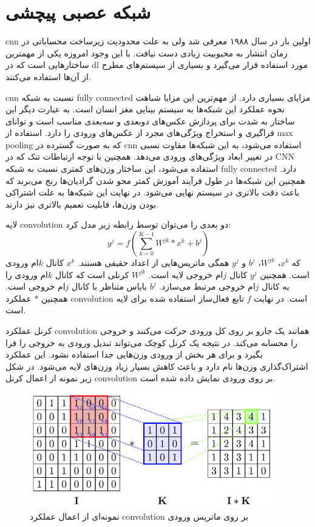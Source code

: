 \section{شبکه عصبی پیچشی}
\gls{cnn} اولین بار در سال ۱۹۸۸ معرفی شد ولی به علت محدودیت زیرساخت محساباتی در
زمان انتشار به محبوبیت زیادی دست نیافت. با این وجود امروزه یکی از مهمترین
ساختارهایی است که در \gls{dl} مورد استفاده قرار می‌گیرد و بسیاری از سیستم‌های
مطرح از آن‌ها استفاده می‌کنند.

\gls{cnn} نسبت به شبکه \gls{fully connected} مزایای بسیاری دارد. از مهم‌ترین این
مزایا شباهت نحوه عملکرد این شبکه‌ها به سیستم بینایی مغز انسان است. به عبارت دیگر
این ساختار به شدت برای پردازش عکس‌های دوبعدی و سه‌بعدی مناسب است و توانای
فراگیری و استخراج ویژگی‌های مجرد از عکس‌های ورودی را دارد. استفاده از \gls{max
pooling} که به صورت گسترده در \gls{cnn} استفاده می‌شود، به این شبکه‌ها مقاوت
نسبی در تغییر ابعاد ویژگی‌های ورودی می‌دهد. همچنین با توجه ارتباطات تنک که در
\gls{CNN} استفاده می‌شود، این ساختار وزن‌های کمتری نسبت به شبکه \gls{fully
connected} دارد. همچنین این شبکه‌ها در طول فرآیند آموزش کمتر محو شدن گرادیان‌ها
رنج می‌برند که باعث دقت بالاتری در سیستم نهایی می‌شود. در نهایت این شبکه‌ها به
علت اشتراکی بودن وزن‌ها، قابلیت تعمیم بالاتری نیز دارند.

لایه \gls{convolution} دو بعدی را می‌توان توسط رابطه زیر مدل کرد:
\begin{equation}
    y^j = f(\sum_{k=0}^{K-1} W^{jk} \ast x^k + b^j)
\end{equation}
که $x^k$، $W^{jk}$، $b^j$ و $y^j$ همگی ماتریس‌هایی از اعداد حقیقی هستند. $x^k$
کانال $k$ام ورودی است. همچنین $y^j$ کانال $j$ام خروجی لایه است. $W^{jk}$ کرنلی
است که کانال $k$ام ورودی را به کانال $j$ام خروجی مرتبط می‌سازد. $b^j$ بایاس
متناظر با کانال $j$ام خروجی است. همچنین $\ast$ عملکرد \gls{convolution} است. در
نهایت $f$ تابع فعال‌ساز استفاده شده برای لایه است.

کرنل عملکرد \gls{convolution} همانند یک جارو بر روی کل ورودی حرکت می‌کنند و
خروجی را محسابه می‌کند. در نتیجه یک کرنل کوچک می‌تواند تبدیل ورودی به خروجی را
فرا بگیرد و برای هر بخش از ورودی وزن‌هایی جدا استفاده نشود. این عملکرد
اشتراک‌گذاری وزن‌ها نام دارد و باعث کاهش بسیار زیاد وزن‌های لایه می‌شود. در شکل
زیر نمونه از اعمال کرنل \gls{convolution} بر روی ورودی نمایش داده شده است.
\begin{figure}[ht]
    \centering
    \includegraphics[height=5cm]{./statics/convolve_operator.png}
    \caption{نمونه‌ای از اعمال عملکرد \gls{convolution} بر روی ماتریس ورودی}
\end{figure}

